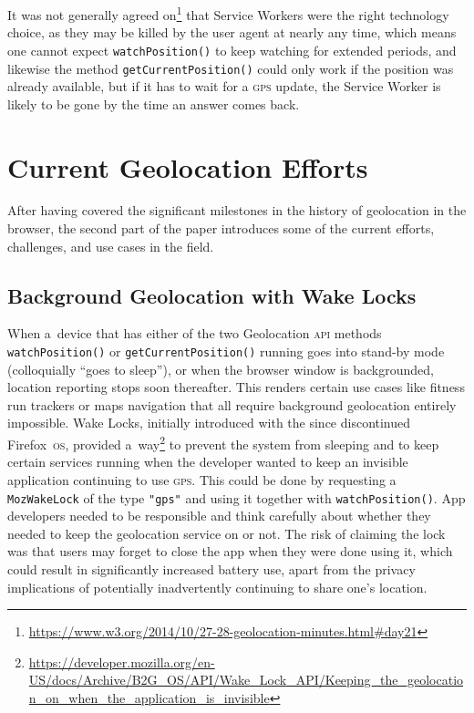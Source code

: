 \documentclass[sigconf,hyphens]{acmart}
\begin{document}
It was not generally agreed on\footnote{\url{https://www.w3.org/2014/10/27-28-geolocation-minutes.html\#day21}}
that Service Workers were the right technology choice,
as they may be killed by the user agent at nearly any time,
which means one cannot expect \texttt{watchPosition()} to keep watching for extended periods,
and likewise the method \texttt{getCurrentPosition()} could only work if the position was already available,
but if it has to wait for a \textsc{gps} update, the Service Worker is likely to be gone
by the time an answer comes back.

\section{Current Geolocation Efforts}

After having covered the significant milestones in the history of geolocation in the browser,
the second part of the paper introduces some of the current efforts, challenges,
and use cases in the field.

\subsection{Background Geolocation with Wake Locks}
\label{sec:wakelocks}

When a~device that has either of the two Geolocation \textsc{api} methods
\texttt{watchPosition()} or \texttt{getCurrentPosition()} running
goes into stand-by mode (colloquially ``goes to sleep''), or
when the browser window is backgrounded, location reporting stops soon thereafter.
This renders certain use cases like fitness run trackers or maps navigation
that all require background geolocation entirely impossible.
Wake Locks, initially introduced with the since discontinued Firefox~\textsc{os},
provided a~way\footnote{\url{https://developer.mozilla.org/en-US/docs/Archive/B2G_OS/API/Wake_Lock_API/Keeping_the_geolocation_on_when_the_application_is_invisible}}
to prevent the system from sleeping and to keep certain services running
when the developer wanted to keep an invisible application continuing to use \textsc{gps}.
This could be done by requesting a \texttt{MozWakeLock} of the type \texttt{"gps"}
and using it together with \texttt{watchPosition()}.
App developers needed to be responsible and think carefully about
whether they needed to keep the geolocation service on or not.
The risk of claiming the lock was that users may forget to close the app
when they were done using it, which could result in significantly increased battery use,
apart from the privacy implications of potentially inadvertently continuing to share one's location.
\end{document}
